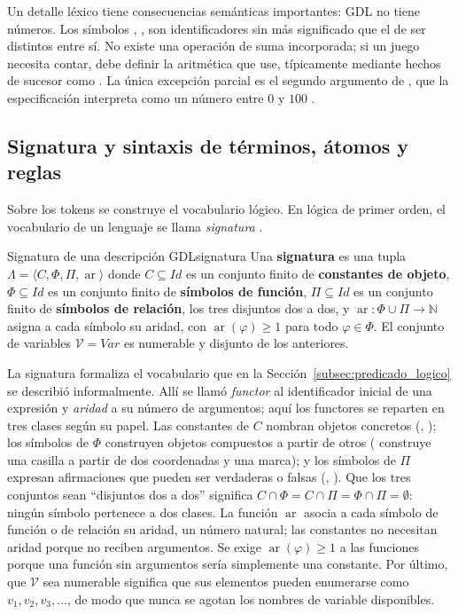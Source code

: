 Un detalle léxico tiene consecuencias semánticas importantes: GDL no tiene números. Los símbolos , ,  son identificadores sin más significado que el de ser distintos entre sí. No existe una operación de suma incorporada; si un juego necesita contar, debe definir la aritmética que use, típicamente mediante hechos de sucesor como . La única excepción parcial es el segundo argumento de , que la especificación interpreta como un número entre $0$ y $100$ \cite{Love2008GDL}.

\subsection{Signatura y sintaxis de términos, átomos y reglas}

Sobre los tokens se construye el vocabulario lógico. En lógica de primer orden, el vocabulario de un lenguaje se llama \emph{signatura} \cite{Lloyd1987}.

\begin{definicion}{Signatura de una descripción GDL}{signatura}
Una \textbf{signatura} es una tupla $\Lambda = \langle C, \Phi, \Pi, \operatorname{ar} \rangle$ donde $C \subseteq \mathit{Id}$ es un conjunto finito de \textbf{constantes de objeto}, $\Phi \subseteq \mathit{Id}$ es un conjunto finito de \textbf{símbolos de función}, $\Pi \subseteq \mathit{Id}$ es un conjunto finito de \textbf{símbolos de relación}, los tres disjuntos dos a dos, y $\operatorname{ar} : \Phi \cup \Pi \to \mathbb N$ asigna a cada símbolo su aridad, con $\operatorname{ar}(\varphi) \ge 1$ para todo $\varphi \in \Phi$. El conjunto de variables $\mathcal V = \mathit{Var}$ es numerable y disjunto de los anteriores.
\end{definicion}

La signatura formaliza el vocabulario que en la Sección~\ref{subsec:predicado_logico} se describió informalmente. Allí se llamó \emph{functor} al identificador inicial de una expresión y \emph{aridad} a su número de argumentos; aquí los functores se reparten en tres clases según su papel. Las constantes de $C$ nombran objetos concretos (, ); los símbolos de $\Phi$ construyen objetos compuestos a partir de otros ( construye una casilla a partir de dos coordenadas y una marca); y los símbolos de $\Pi$ expresan afirmaciones que pueden ser verdaderas o falsas (, ). Que los tres conjuntos sean ``disjuntos dos a dos'' significa $C \cap \Phi = C \cap \Pi = \Phi \cap \Pi = \emptyset$: ningún símbolo pertenece a dos clases. La función $\operatorname{ar}$ asocia a cada símbolo de función o de relación su aridad, un número natural; las constantes no necesitan aridad porque no reciben argumentos. Se exige $\operatorname{ar}(\varphi) \ge 1$ a las funciones porque una función sin argumentos sería simplemente una constante. Por último, que $\mathcal V$ sea numerable significa que sus elementos pueden enumerarse como $v_1, v_2, v_3, \dots$, de modo que nunca se agotan los nombres de variable disponibles.

